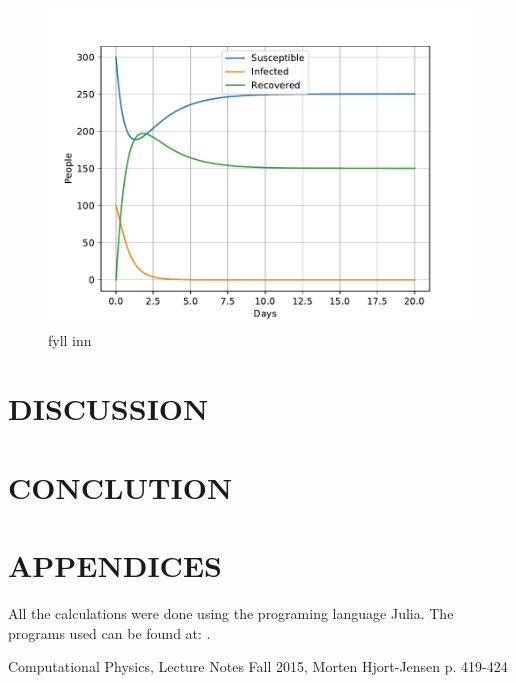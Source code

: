 \documentclass[a4paper]{article}
\let\Oldsection\section
\renewcommand{\section}{\FloatBarrier\Oldsection}
\begin{document}
\begin{figure}[!htb]
	\includegraphics[scale=0.56]{../plots/opp_e_fd.pdf}
	\caption{fyll inn}
	\label{opp_e2}
\end{figure}



\section{DISCUSSION}



\section{CONCLUTION}




\section{APPENDICES}
All the calculations were done using the programing language Julia. The programs used can be found at:
\url{}.
	
\begin{thebibliography}{9}
	Computational Physics, Lecture Notes Fall 2015, Morten Hjort-Jensen p. 419-424
\end{thebibliography}











	
	
	
	
	
	
	
	
	
	
	
	
	
	
	
\end{document}
